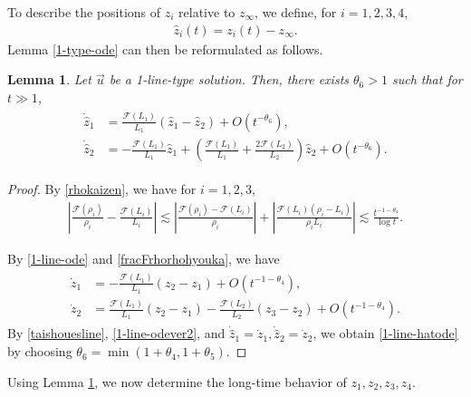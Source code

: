 \documentclass[10pt,a4paper]{amsart}
\newtheorem{lemma}[theorem]{Lemma}
\numberwithin{equation}{section}
\begin{document}
To describe the positions of $z_i$ relative to $z_{\infty}$, we define, for $i=1,2,3,4$,
\begin{align}\label{hatzdef}
\hat{z}_i(t)=z_i(t)-z_{\infty}.
\end{align}
Lemma \ref{1-type-ode} can then be reformulated as follows.
\begin{lemma}\label{1-type-odekaizen5}
Let $\vec{u}$ be a 1-line-type solution. Then, there exists $\theta_6>1$ such that for $t\gg 1$,
\begin{align}\label{1-line-hatode}
\begin{aligned}
\dot{\hat{z}}_1&=\frac{\mathcal{F}(L_1)}{L_1}\left(\hat{z}_1-\hat{z}_2\right)+O\left(t^{-\theta_6}\right),
\\
\dot{\hat{z}}_2&=-\frac{\mathcal{F}(L_1)}{L_1}\hat{z}_1+\left(\frac{\mathcal{F}(L_1)}{L_1}+\frac{2\mathcal{F}(L_2)}{L_2}\right)\hat{z}_2+O\left(t^{-\theta_6}\right).
\end{aligned}
\end{align}
\end{lemma}

\begin{proof}
By \eqref{rhokaizen}, we have for $i=1,2,3$,
\begin{align}\label{fracFrhorhohyouka}
\left|\frac{\mathcal{F}(\rho_i)}{\rho_i}-\frac{\mathcal{F}(L_i)}{L_i}\right|\lesssim \left|\frac{\mathcal{F}(\rho_i)-\mathcal{F}(L_i)}{\rho_i}\right|+\left|\frac{\mathcal{F}(L_i)(\rho_i-L_i)}{\rho_iL_i}\right|\lesssim \frac{t^{-1-\theta_4}}{\log{t}}.
\end{align}

By \eqref{1-line-ode} and \eqref{fracFrhorhohyouka}, we have
\begin{align}\label{1-line-odever2}
\begin{aligned}
\dot{z}_1&=-\frac{\mathcal{F}(L_1)}{L_1}\left(z_2-z_1\right)+O\left(t^{-1-\theta_4}\right),
\\
\dot{z}_2&=\frac{\mathcal{F}(L_1)}{L_1}\left(z_2-z_1\right)-\frac{\mathcal{F}(L_2)}{L_2}\left(z_3-z_2\right)+O\left(t^{-1-\theta_4}\right).
\end{aligned}
\end{align}
By \eqref{taishouesline}, \eqref{1-line-odever2}, and $\dot{\hat{z}}_1=\dot{z}_1,\dot{\hat{z}}_2=\dot{z}_2$, we obtain \eqref{1-line-hatode} by choosing $\theta_6=\min{(1+\theta_4,1+\theta_5)}$.


\end{proof}


Using Lemma \ref{1-type-odekaizen5}, we now determine the long-time behavior of $z_1,z_2,z_3,z_4$.
\end{document}

